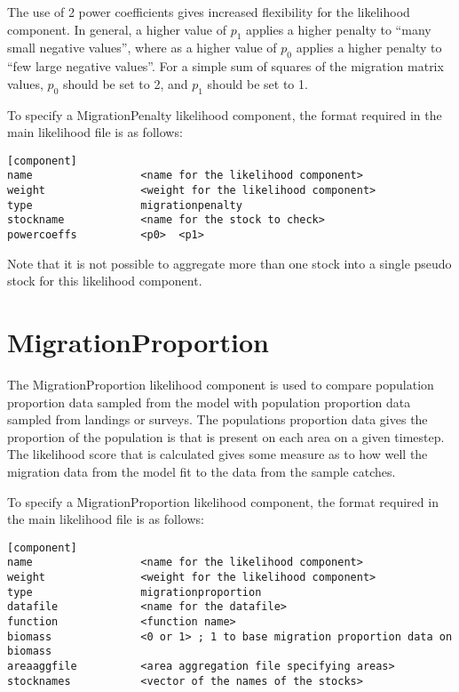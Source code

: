 \documentclass[]{book}
\begin{document}
The use of 2 power coefficients gives increased flexibility for the
likelihood component. In general, a higher value of \(p_1\) applies a
higher penalty to ``many small negative values'', where as a higher value
of \(p_0\) applies a higher penalty to ``few large negative values''. For a
simple sum of squares of the migration matrix values, \(p_0\) should be
set to 2, and \(p_1\) should be set to 1.

To specify a MigrationPenalty likelihood component, the format required
in the main likelihood file is as follows:

\begin{verbatim}
[component]
name                 <name for the likelihood component>
weight               <weight for the likelihood component>
type                 migrationpenalty
stockname            <name for the stock to check>
powercoeffs          <p0>  <p1>
\end{verbatim}

Note that it is not possible to aggregate more than one stock into a
single pseudo stock for this likelihood component.

\hypertarget{sec:migpro}{%
\section{MigrationProportion}\label{sec:migpro}}

The MigrationProportion likelihood component is used to compare
population proportion data sampled from the model with population
proportion data sampled from landings or surveys. The populations
proportion data gives the proportion of the population is that is
present on each area on a given timestep. The likelihood score that is
calculated gives some measure as to how well the migration data from the
model fit to the data from the sample catches.

To specify a MigrationProportion likelihood component, the format
required in the main likelihood file is as follows:

\begin{verbatim}
[component]
name                 <name for the likelihood component>
weight               <weight for the likelihood component>
type                 migrationproportion
datafile             <name for the datafile>
function             <function name>
biomass              <0 or 1> ; 1 to base migration proportion data on biomass
areaaggfile          <area aggregation file specifying areas>
stocknames           <vector of the names of the stocks>
\end{verbatim}
\end{document}
